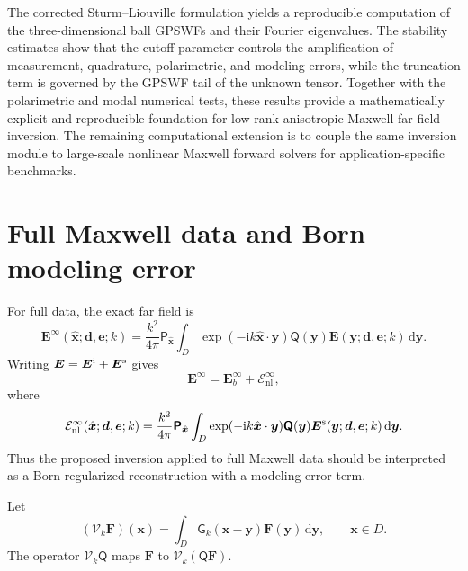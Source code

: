 \documentclass[11pt]{article}
\numberwithin{equation}{section}
\newcommand{\ii}{\mathrm{i}}
\newcommand{\dd}{\,\mathrm d}
\newcommand{\vect}[1]{\bm{#1}}
\newcommand{\tens}[1]{\bm{\mathsf{#1}}}
\newcommand{\G}{\ensuremath{\tens{G}}}
\newcommand{\Qt}{\ensuremath{\tens{Q}}}
\theoremstyle{plain}
\theoremstyle{definition}
\begin{document}
The corrected Sturm--Liouville formulation yields a reproducible computation of the three-dimensional ball GPSWFs and their Fourier eigenvalues.  The stability estimates show that the cutoff parameter controls the amplification of measurement, quadrature, polarimetric, and modeling errors, while the truncation term is governed by the GPSWF tail of the unknown tensor.  Together with the polarimetric and modal numerical tests, these results provide a mathematically explicit and reproducible foundation for low-rank anisotropic Maxwell far-field inversion.  The remaining computational extension is to couple the same inversion module to large-scale nonlinear Maxwell forward solvers for application-specific benchmarks.


\appendix 

\section{Full Maxwell data and Born modeling error}\label{sec:nonlinear}

For full data, the exact far field is
\begin{equation*}
  \vect{E}^\infty(\hat{\vect{x}};\vect{d},\vect{e};k)=\frac{k^2}{4\pi}\tens{P}_{\hat{\vect{x}}}
  \int_D\exp(-\ii k\hat{\vect{x}}\cdot \vect{y})\Qt(\vect{y})\vect{E}(\vect{y};\vect{d},\vect{e};k)\dd \vect{y} .
\end{equation*}
Writing $\vect{E}=\vect{E}^{\rm i}+\vect{E}^{\rm s}$ gives
\begin{equation*}
  \vect{E}^\infty=\vect{E}_b^\infty+\mathcal{E}_{\mathrm{nl}}^\infty,
\end{equation*}
where
\begin{equation}\label{eq:nonlinear_farfield}
  \mathcal{E}_{\mathrm{nl}}^\infty(\hat{\vect{x}};\vect{d},\vect{e};k)=\frac{k^2}{4\pi}\tens{P}_{\hat{\vect{x}}}
  \int_D\exp(-\ii k\hat{\vect{x}}\cdot \vect{y})\Qt(\vect{y})\vect{E}^{\rm s}(\vect{y};\vect{d},\vect{e};k)\dd \vect{y} .
\end{equation}
Thus the proposed inversion applied to full Maxwell data should be interpreted as a Born-regularized reconstruction with a modeling-error term.

Let
\begin{equation*}
  (\mathcal V_k\vect{F})(\vect{x})=\int_D\G_k(\vect{x}-\vect{y})\vect{F}(\vect{y})\dd \vect{y},
  \qquad \vect{x}\in D .
\end{equation*}
The operator $\mathcal V_k\Qt$ maps $\vect{F}$ to $\mathcal V_k(\Qt\vect{F})$.
\end{document}
